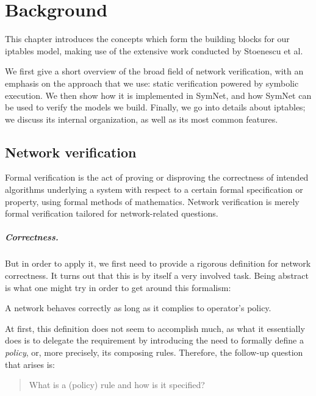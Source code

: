 \chapter{Background}\label{chapter:background}

This chapter introduces the concepts which form the building blocks for our
iptables model, making use of the extensive work conducted by Stoenescu et
al.~\cite{stoenescu2013symnet, stoenescu2016symnet}

We first give a short overview of the broad field of network verification, with
an emphasis on the approach that we use: static verification powered by
symbolic execution.  We then show how it is implemented in SymNet, and how
SymNet can be used to verify the models we build.  Finally, we go into details
about iptables; we discuss its internal organization, as well as its most
common features.


\section{Network verification}\label{sec:network-verification}
Formal verification is the act of proving or disproving the correctness of
intended algorithms underlying a system with respect to a certain formal
specification or property, using formal methods of mathematics. Network
verification is merely formal verification tailored for network-related
questions.

\paragraph{Correctness.}\label{par:correctness}
But in order to apply it, we first need to provide a rigorous definition for
network correctness.  It turns out that this is by itself a very involved task.
Being abstract is what one might try in order to get around this formalism:

\begin{definition}
\label{def:full-correctness}
A network behaves correctly as long as it complies to operator's policy.
\end{definition}

At first, this definition does not seem to accomplish much, as what it
essentially does is to delegate the requirement by introducing the need to
formally define a \emph{policy}, or, more precisely, its composing rules.
Therefore, the follow-up question that arises is:

\begin{quote}
What is a (policy) rule and how is it specified?
\end{quote}

